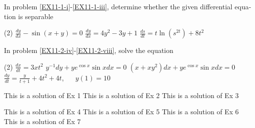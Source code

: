 
\renewcommand{\QuestionNB}{\hspace{-2.25em}سوال~\arabic{Question}.\ }
\setlength{\QuestionIndent}{3em}



\begin{ExerciseList}
  \vspace{-\baselineskip}%
  \Exercise[title=سوالات]
\end{ExerciseList}

\begin{otherlanguage}{english}
\begin{Exercise}\label{EX11}
        \vspace{-\baselineskip}%
        \Question In problem \ref{EX11-1-i}-\ref{EX11-1-iii}, determine whether the given differential equation is separable  
        \begin{tasks}(2)
            \task\label{EX11-1-i} $\frac{dy}{dx}-\sin{(x+y)}=0$     
            \task $\frac{dy}{dx}=4y^2-3y+1$ 
            \task\label{EX11-1-iii} $\frac{ds}{dt}=t\ln{(s^{2t})}+8t^2$ 
        \end{tasks}
        \Question In problem \ref{EX11-2-iv}-\ref{EX11-2-viii}, solve the equation 
        \begin{tasks}[resume=true](2)
            \task\label{EX11-2-iv} $\frac{dx}{dt}=3xt^2$
            \task $y^{-1}dy+ye^{\cos{x}}\sin{x}dx=0$
            \task $(x+xy^2)dx+ye^{\cos{x}}\sin{x}dx=0$
            \task\label{EX11-2-viii} $\frac{dy}{dt} = \frac{y}{t+1} + 4t^2 +  4t$, $\quad$ $y(1) = 10$
        \end{tasks}
    \end{Exercise}

    \begin{multicols}{2}
        \begin{Answer}[ref={EX11}]
            \Question 
            \begin{tasks}
                \task This is a solution of Ex 1
                \task This is a solution of Ex 2 
                \task This is a solution of Ex 3 
            \end{tasks} 
            \Question 
            \begin{tasks}[resume=true]
                \task This is a solution of Ex 4
                \task This is a solution of Ex 5 
                \task This is a solution of Ex 6 
                \task This is a solution of Ex 7 
            \end{tasks} 
        \end{Answer}
    \end{multicols}


\end{otherlanguage}
